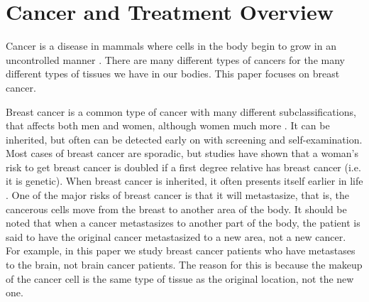 \section{Cancer and Treatment Overview}
\label{app:apdxb}

Cancer is a disease in mammals where cells in the body begin to grow in an uncontrolled manner \cite{Cooper1992}. There are many different types of cancers for the many different types of tissues we have in our bodies. This paper focuses on breast cancer.

Breast cancer is a common type of cancer with many different subclassifications, that affects both men and women, although women much more \cite{Cooper1992}. It can be inherited, but often can be detected early on with screening and self-examination. Most cases of breast cancer are sporadic, but studies have shown that a woman's risk to get breast cancer is doubled if a first degree relative has breast cancer (i.e. it is genetic). When breast cancer is inherited, it often presents itself earlier in life \cite{Morris1998}.  One of the major risks of breast cancer is that it will metastasize, that is, the cancerous cells move from the breast to another area of the body. It should be noted that when a cancer metastasizes to another part of the body, the patient is said to have the original cancer metastasized to a new area, not a new cancer. For example, in this paper we study breast cancer patients who have metastases to the brain, not brain cancer patients. The reason for this is because the makeup of the cancer cell is the same type of tissue as the original location, not the new one.

